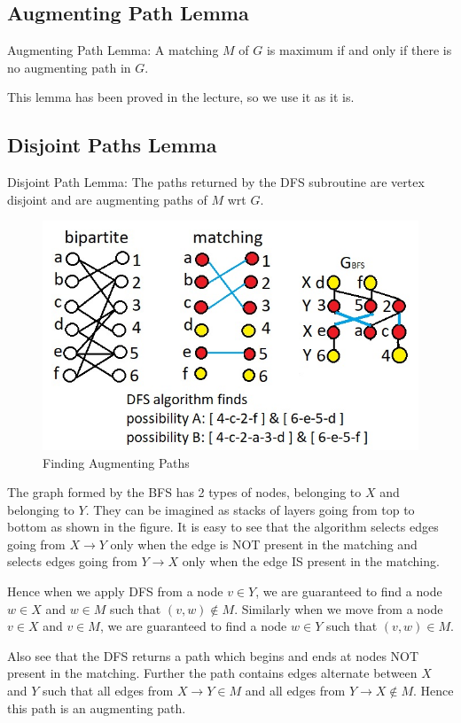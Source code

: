 \subsection{Augmenting Path Lemma}
Augmenting Path Lemma: A matching $M$ of $G$ is maximum if and only if there is no augmenting path in $G$.

This lemma has been proved in the lecture, so we use it as it is.

\subsection{Disjoint Paths Lemma}
Disjoint Path Lemma: The paths returned by the DFS subroutine are vertex disjoint and are augmenting paths of $M$ wrt $G$.

\begin{figure}[!h]
    \centering
    \includegraphics[scale=0.7]{hopcroftkarp_bfs.jpg}
    \caption{Finding Augmenting Paths}
\end{figure}

The graph formed by the BFS has 2 types of nodes, belonging to $X$ and belonging to $Y$. They can be imagined as stacks of layers going from top to bottom as shown in the figure. It is easy to see that the algorithm selects edges going from $X \to Y$ only when the edge is NOT present in the matching and selects edges going from $Y \to X$ only when the edge IS present in the matching.

Hence when we apply DFS from a node $v \in Y$, we are guaranteed to find a node $w \in X$ and $w \in M$ such that $(v, w) \notin M$. Similarly when we move from a node $v \in X $ and $v \in M$, we are guaranteed to find a node $w \in Y$ such that $(v, w) \in M$.

Also see that the DFS returns a path which begins and ends at nodes NOT present in the matching. Further the path contains edges alternate between $X$ and $Y$ such that all edges from $X \to Y \in M$ and all edges from $Y \to X \notin M$. Hence this path is an augmenting path.

